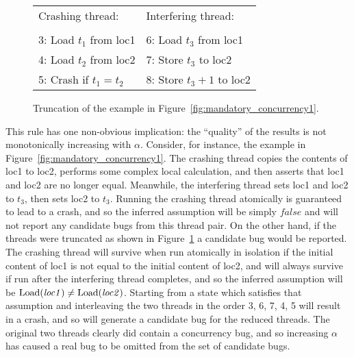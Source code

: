 \begin{figure}
\begin{centering}
\hfill
\begin{tabular}{p{8cm}l}
Crashing thread:          & Interfering thread: \\
\\
3: Load $t_1$ from loc1   & 6: Load $t_3$ from loc1 \\
4: Load $t_2$ from loc2   & 7: Store $t_3$ to loc2 \\
5: Crash if $t_1 = t_2$   & 8: Store $t_3 + 1$ to loc2
\end{tabular}
\hfill
\end{centering}
\caption{Truncation of the example in Figure~\ref{fig:mandatory_concurrency1}.}
\label{fig:mandatory_concurrency2}
\end{figure}


This rule has one non-obvious implication: the ``quality'' of the
results is not monotonically increasing with $\alpha$.  Consider, for
instance, the example in
Figure~\ref{fig:mandatory_concurrency1}.  The crashing thread copies the contents of loc1 to loc2,
performs some complex local calculation, and then asserts that loc1
and loc2 are no longer equal.  Meanwhile, the interfering thread sets
loc1 and loc2 to $t_3$, then sets loc2 to $t_3$.  Running the crashing
thread atomically is guaranteed to lead to a crash, and so the
inferred assumption will be simply $\mathit{false}$ and {\technique}
will not report any candidate bugs from this thread pair.  On the
other hand, if the threads were truncated as shown in
Figure~\ref{fig:mandatory_concurrency2} a candidate bug would be
reported.  The crashing thread will survive when run atomically in
isolation if the initial content of loc1 is not equal to the initial
content of loc2, and will always survive if run after the interfering
thread completes, and so the inferred assumption will be
$\mathrm{Load}(\mathit{loc1}) \not= \mathrm{Load}(\mathit{loc2})$.  Starting from
a state which satisfies that assumption and interleaving the two
threads in the order 3, 6, 7, 4, 5 will result in
a crash, and so {\technique} will generate a candidate bug for the
reduced threads.  The original two threads clearly did contain a
concurrency bug, and so increasing $\alpha$ has caused a real bug to
be omitted from the set of candidate bugs.

